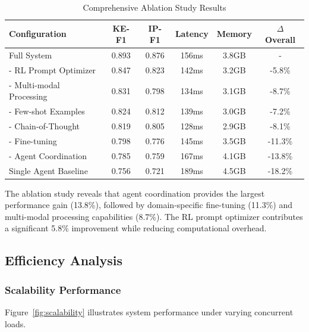 \documentclass[11pt,a4paper]{article}
\begin{document}
\begin{table}[htbp]
\centering
\caption{Comprehensive Ablation Study Results}
\label{tab:ablation_detailed}
\begin{tabular}{lccccc}
\toprule
\textbf{Configuration} & \textbf{KE-F1} & \textbf{IP-F1} & \textbf{Latency} & \textbf{Memory} & \textbf{$\Delta$ Overall} \\
\midrule
Full System & 0.893 & 0.876 & 156ms & 3.8GB & - \\
\midrule
- RL Prompt Optimizer & 0.847 & 0.823 & 142ms & 3.2GB & -5.8\% \\
- Multi-modal Processing & 0.831 & 0.798 & 134ms & 3.1GB & -8.7\% \\
- Few-shot Examples & 0.824 & 0.812 & 139ms & 3.0GB & -7.2\% \\
- Chain-of-Thought & 0.819 & 0.805 & 128ms & 2.9GB & -8.1\% \\
- Fine-tuning & 0.798 & 0.776 & 145ms & 3.5GB & -11.3\% \\
- Agent Coordination & 0.785 & 0.759 & 167ms & 4.1GB & -13.8\% \\
\midrule
Single Agent Baseline & 0.756 & 0.721 & 189ms & 4.5GB & -18.2\% \\
\bottomrule
\end{tabular}
\end{table}

The ablation study reveals that agent coordination provides the largest performance gain (13.8\%), followed by domain-specific fine-tuning (11.3\%) and multi-modal processing capabilities (8.7\%). The RL prompt optimizer contributes a significant 5.8\% improvement while reducing computational overhead.

\subsection{Efficiency Analysis}

\subsubsection{Scalability Performance}

Figure~\ref{fig:scalability} illustrates system performance under varying concurrent loads.
\end{document}
